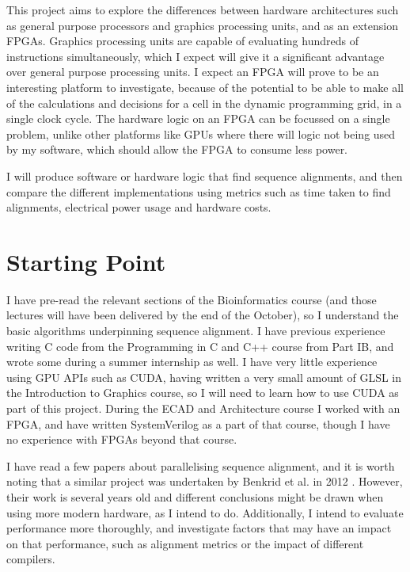 This project aims to explore the differences between hardware architectures such as general purpose processors and graphics processing units, and as an extension FPGAs.
Graphics processing units are capable of evaluating hundreds of instructions simultaneously, which I expect will give it a significant advantage over general purpose processing units.
I expect an FPGA will prove to be an interesting platform to investigate, because of the potential to be able to make all of the calculations and decisions for a cell in the dynamic programming grid, in a single clock cycle.
The hardware logic on an FPGA can be focussed on a single problem, unlike other platforms like GPUs where there will logic not being used by my software, which should allow the FPGA to consume less power.

I will produce software or hardware logic that find sequence alignments, and then compare the different implementations using metrics such as time taken to find alignments, electrical power usage and hardware costs.

\section*{Starting Point}

I have pre-read the relevant sections of the Bioinformatics course (and those lectures will have been delivered by the end of the October), so I understand the basic algorithms underpinning sequence alignment.
I have previous experience writing C code from the Programming in C and C++ course from Part IB, and wrote some during a summer internship as well.
I have very little experience using GPU APIs such as CUDA, having written a very small amount of GLSL in the Introduction to Graphics course, so I will need to learn how to use CUDA as part of this project.
During the ECAD and Architecture course I worked with an FPGA, and have written SystemVerilog as a part of that course, though I have no experience with FPGAs beyond that course.

I have read a few papers about parallelising sequence alignment, and it is worth noting that a similar project was undertaken by Benkrid et al. in 2012 \cite{Benkrid12}.
However, their work is several years old and different conclusions might be drawn when using more modern hardware, as I intend to do.
Additionally, I intend to evaluate performance more thoroughly, and investigate factors that may have an impact on that performance, such as alignment metrics or the impact of different compilers.

